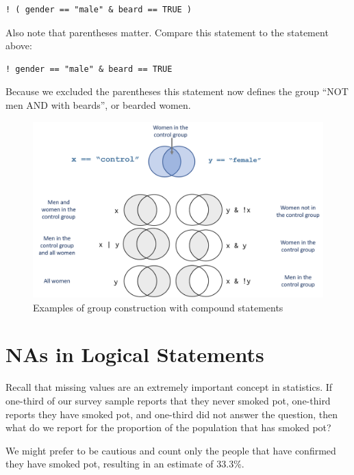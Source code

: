 \documentclass[]{book}
\theoremstyle{definition}
\theoremstyle{definition}
\theoremstyle{definition}
\theoremstyle{remark}
\begin{document}
\begin{verbatim}
! ( gender == "male" & beard == TRUE )
\end{verbatim}

Also note that parentheses matter. Compare this statement to the
statement above:

\begin{verbatim}
! gender == "male" & beard == TRUE
\end{verbatim}

Because we excluded the parentheses this statement now defines the group
``NOT men AND with beards'', or bearded women.

\begin{figure}

{\centering \includegraphics[width=0.9\linewidth]{figures/compound_logical_statements} 

}

\caption{Examples of group construction with compound statements}\label{fig:unnamed-chunk-104}
\end{figure}

\hypertarget{nas-in-logical-statements}{%
\section{NAs in Logical Statements}\label{nas-in-logical-statements}}

Recall that missing values are an extremely important concept in
statistics. If one-third of our survey sample reports that they never
smoked pot, one-third reports they have smoked pot, and one-third did
not answer the question, then what do we report for the proportion of
the population that has smoked pot?

We might prefer to be cautious and count only the people that have
confirmed they have smoked pot, resulting in an estimate of 33.3\%.
\end{document}
